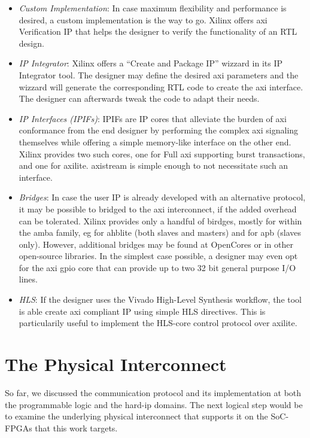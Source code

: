 \begin{itemize}
\item	\emph{Custom Implementation}:
	In case maximum flexibility and performance is desired,
	a custom implementation is the way to go. 
	Xilinx offers \gls{axi} Verification IP that helps the designer to verify the functionality
	of an RTL design.
\item	\emph{IP Integrator}:
	Xilinx offers a ``Create and Package IP'' wizzard in its IP Integrator tool.
	The designer may define the desired \gls{axi} parameters 
	and the wizzard will generate the corresponding RTL code
	to create the \gls{axi} interface. 
	The designer can afterwards tweak the code to adapt their needs.
\item	\emph{IP Interfaces (IPIFs)}:
	IPIFs are IP cores that alleviate the burden of \gls{axi} conformance 
	from the end designer by performing the complex \gls{axi} signaling 
	themselves while offering a simple memory-like interface on the other end. 
	Xilinx provides two such cores, one for Full \gls{axi} 
	supporting \gls{burst} transactions, and one for \gls{axilite}.
	\gls{axistream} is simple enough to not necessitate such an interface.
\item	\emph{Bridges}: In case the user IP is already developed with an alternative protocol,
	it may be possible to bridged to the \gls{axi} interconnect, 
	if the added overhead can be tolerated.
	Xilinx provides only a handful of birdges, 
	mostly for within the \gls{amba} family, 
	eg for \gls{ahblite} (both slaves and masters) and for \gls{apb} (slaves only). 
	However, additional bridges may be found at OpenCores
	or in other open-source libraries. 
	In the simplest case possible, a designer may even opt for 
	the \gls{axi} \gls{gpio} core that can provide up to two 32 bit general purpose I/O lines.
\item	\emph{HLS}: If the designer uses the Vivado High-Level Synthesis workflow,
	the tool is able create \gls{axi} compliant IP using simple HLS directives. 
	This is particularily useful to implement
	the HLS-core control protocol over \gls{axilite}.
\end{itemize}

\section{The Physical Interconnect}

So far, we discussed the communication protocol and its implementation at both 
the programmable logic and the hard-ip domains.
The next logical step would be to examine the underlying physical interconnect
that supports it on the SoC-FPGAs that this work targets. 

